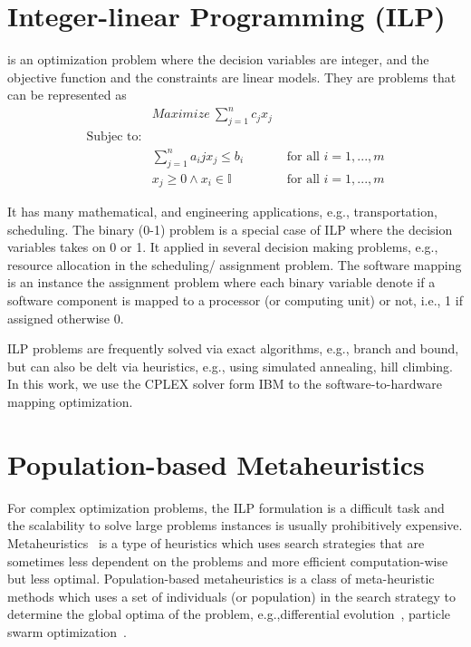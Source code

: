 \section{Integer-linear Programming (ILP)}
\ilp{} is an optimization problem where the decision variables are integer, and the objective function and the constraints are linear models.  They are problems that can be represented as 
\begin{align}
	&Maximize\ \sum_{j=1}^{n}{c_jx_j}\\
	\mbox{Subjec to:}&\\
	&\sum_{j=1}^n{a_ijx_j}\leq b_i&\mbox{ for all } i=1,...,m\\
	&x_j\geq 0 \land x_i\in \mathbb{I} &\mbox{ for all } i=1,...,m
\end{align}

It has many mathematical, and engineering applications, e.g., transportation, scheduling. The binary (0-1) problem is a special case of ILP where the decision variables takes on 0 or 1. It applied in several decision making problems, e.g., resource allocation in the scheduling/ assignment problem. The software mapping is an instance the assignment problem where each binary variable denote if a software component is mapped to a  processor (or computing unit) or not, i.e., 1 if assigned otherwise 0. 

ILP problems are frequently solved via exact algorithms, e.g., branch and bound, but can also be delt via heuristics, e.g., using simulated annealing, hill climbing. In this work, we use the CPLEX solver form IBM to the software-to-hardware mapping optimization.
\section{Population-based Metaheuristics}
For complex optimization problems, the ILP formulation is a difficult task and the scalability to solve large problems instances is usually prohibitively expensive. Metaheuristics~\cite{2006HandbookMetaheuristics}\cite{Gonzalez2007HandbookMetaheuristics} is a type of heuristics which uses search strategies that are sometimes less dependent on the problems and more efficient computation-wise but less optimal. Population-based metaheuristics is a class of meta-heuristic methods which uses a set of individuals (or population) in the search strategy to determine the global optima of the problem, e.g.,differential evolution~\cite{Storn1997DifferentialSpaces}\cite{Das2016RecentSurvey}, particle swarm optimization~\cite{2016ParticleOptimization}\cite{Sengupta2018ParticlePerspectivesb}.

